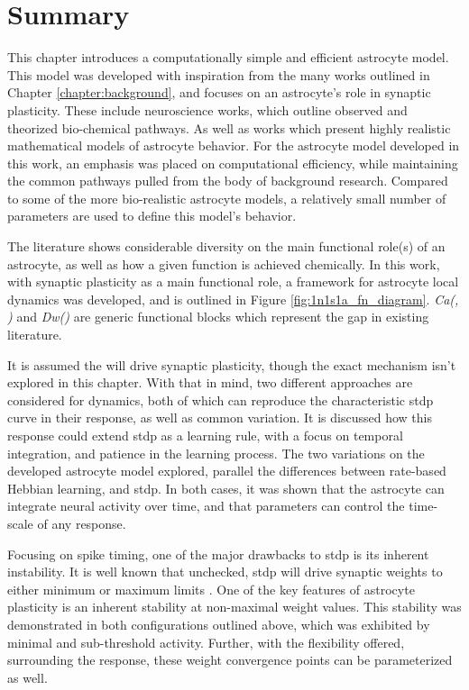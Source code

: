 
\section{Summary}

This chapter introduces a computationally simple and efficient astrocyte
model. This model was developed with inspiration from the many works outlined in
Chapter \ref{chapter:background}, and focuses on an astrocyte's role in synaptic
plasticity. These include neuroscience works, which outline observed and
theorized bio-chemical pathways. As well as works which present highly realistic
mathematical models of astrocyte behavior. For the astrocyte model developed in
this work, an emphasis was placed on computational efficiency, while maintaining
the common pathways pulled from the body of background research. Compared to
some of the more bio-realistic astrocyte models, a relatively small number of
parameters are used to define this model's behavior.

The literature shows considerable diversity on the main functional role(s) of an
astrocyte, as well as how a given function is achieved chemically. In this work,
with synaptic plasticity as a main functional role, a framework for astrocyte
local dynamics was developed, and is outlined in Figure
\ref{fig:1n1s1a_fn_diagram}. \emph{Ca(\ipt, \kp)} and \emph{Dw(\ca)} are generic
functional blocks which represent the gap in existing literature.

It is assumed the \ca will drive synaptic plasticity, though the exact mechanism
isn't explored in this chapter. With that in mind, two different approaches are
considered for \ca dynamics, both of which can reproduce the characteristic
\gls{stdp} curve in their \ca response, as well as common variation. It is discussed
how this \ca response could extend \gls{stdp} as a learning rule, with a focus
on temporal integration, and patience in the learning process. The two
variations on the developed astrocyte model explored, parallel the differences
between rate-based Hebbian learning, and \gls{stdp}. In both cases, it was shown
that the astrocyte can integrate neural activity over time, and that parameters
can control the time-scale of any response.

Focusing on spike timing, one of the major drawbacks to \gls{stdp} is its
inherent instability. It is well known that unchecked, \gls{stdp} will drive
synaptic weights to either minimum or maximum limits
\parencite{legenstein_2005}. One of the key features of astrocyte plasticity is
an inherent stability at non-maximal weight values. This stability was
demonstrated in both configurations outlined above, which was exhibited by
minimal and sub-threshold \ca activity. Further, with the flexibility offered,
surrounding the \ca response, these weight convergence points can be
parameterized as well.

